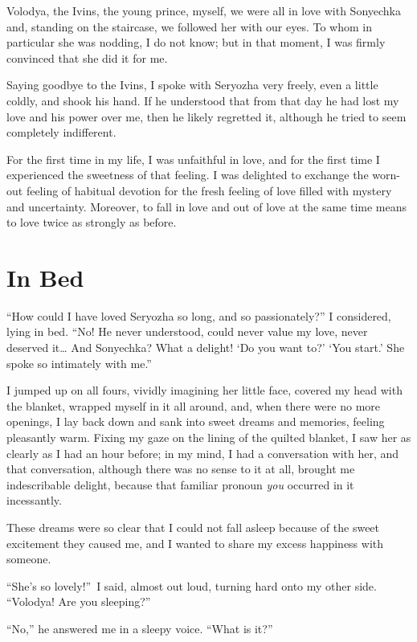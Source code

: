Volodya, the Ivins, the young prince, myself, we were all in love with Sonyechka and, standing on the staircase, we followed her with our eyes. To whom in particular she was nodding, I do not know; but in that moment, I was firmly convinced that she did it for me.

Saying goodbye to the Ivins, I spoke with Seryozha very freely, even a little coldly, and shook his hand. If he understood that from that day he had lost my love and his power over me, then he likely regretted it, although he tried to seem completely indifferent.

For the first time in my life, I was unfaithful in love, and for the first time I experienced the sweetness of that feeling. I was delighted to exchange the worn-out feeling of habitual devotion for the fresh feeling of love filled with mystery and uncertainty. Moreover, to fall in love and out of love at the same time means to love twice as strongly as before.

\chapter{In Bed} %

``How could I have loved Seryozha so long, and so passionately?'' I considered, lying in bed. ``No! He never understood, could never value my love, never deserved it\ldots{} And Sonyechka? What a delight! `Do you want to?' `You start.' She spoke so intimately with me.'' %

I jumped up on all fours, vividly imagining her little face, covered my head with the blanket, wrapped myself in it all around, and, when there were no more openings, I lay back down and sank into sweet dreams and memories, feeling pleasantly warm. Fixing my gaze on the lining of the quilted blanket, I saw her as clearly as I had an hour before; in my mind, I had a conversation with her, and that conversation, although there was no sense to it at all, brought me indescribable delight, because that familiar pronoun \textit{you} occurred in it incessantly.

These dreams were so clear that I could not fall asleep because of the sweet excitement they caused me, and I wanted to share my excess happiness with someone. 

``She's so lovely!''~I said, almost out loud, turning hard onto my other side. ``Volodya! Are you sleeping?'' %

``No,'' he answered me in a sleepy voice. ``What is it?'' %

